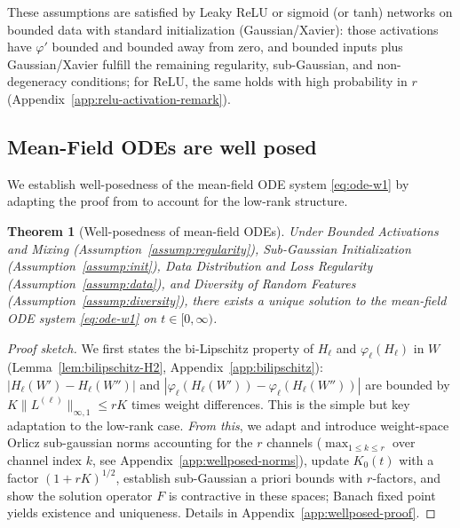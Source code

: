 \documentclass[nohyperref]{article}
\theoremstyle{plain}
\newtheorem{theorem}{Theorem}[section]
\theoremstyle{definition}
\theoremstyle{remark}
\begin{document}
These assumptions are satisfied by Leaky ReLU or sigmoid (or tanh) networks on bounded data with standard initialization (Gaussian/Xavier): those activations have $\varphi'$ bounded and bounded away from zero, and bounded inputs plus Gaussian/Xavier fulfill the remaining regularity, sub-Gaussian, and non-degeneracy conditions; for ReLU, the same holds with high probability in $r$ (Appendix~\ref{app:relu-activation-remark}).















\subsection{Mean-Field ODEs are well posed}
\label{sec:wellposed}

We establish well-posedness of the mean-field ODE system \eqref{eq:ode-w1} by adapting the proof from \cite{nguyen2023rigorousframeworkmeanfield} to account for the low-rank structure.

\begin{theorem}[Well-posedness of mean-field ODEs]
\label{thm:wellposed}
Under \emph{Bounded Activations and Mixing} (Assumption~\ref{assump:regularity}), \emph{Sub-Gaussian Initialization} (Assumption~\ref{assump:init}), \emph{Data Distribution and Loss Regularity} (Assumption~\ref{assump:data}), and \emph{Diversity of Random Features} (Assumption~\ref{assump:diversity}), there exists a unique solution to the mean-field ODE system \eqref{eq:ode-w1} on $t\in[0,\infty)$.
\end{theorem}

\begin{proof}[Proof sketch]
We first states the bi-Lipschitz property of $H_\ell$ and $\varphi_\ell(H_\ell)$ in $W$ (Lemma~\ref{lem:bilipschitz-H2}, Appendix~\ref{app:bilipschitz}): $|H_\ell(W')-H_\ell(W'')|$ and $|\varphi_\ell(H_\ell(W'))-\varphi_\ell(H_\ell(W''))|$ are bounded by $K\|L^{(\ell)}\|_{\infty,1}\le rK$ times weight differences. This is the simple but key adaptation to the low-rank case. \emph{From this}, we adapt and introduce weight-space Orlicz sub-gaussian norms accounting for the $r$ channels ($\max_{1\le k\le r}$ over channel index $k$, see Appendix~\ref{app:wellposed-norms}), update $K_0(t)$ with a factor $(1+rK)^{1/2}$, establish sub-Gaussian a priori bounds with $r$-factors, and show the solution operator $F$ is contractive in these spaces; Banach fixed point yields existence and uniqueness. Details in Appendix~\ref{app:wellposed-proof}.
\end{proof}
\end{document}
